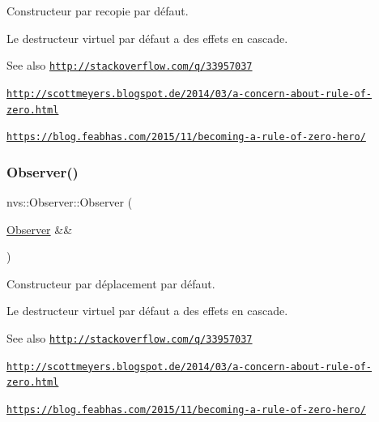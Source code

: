 Constructeur par recopie par défaut. 

Le destructeur virtuel par défaut a des effets en cascade.

\begin{DoxySeeAlso}{See also}
\href{http://stackoverflow.com/q/33957037}{\tt http\+://stackoverflow.\+com/q/33957037} 

\href{http://scottmeyers.blogspot.de/2014/03/a-concern-about-rule-of-zero.html}{\tt http\+://scottmeyers.\+blogspot.\+de/2014/03/a-\/concern-\/about-\/rule-\/of-\/zero.\+html} 

\href{https://blog.feabhas.com/2015/11/becoming-a-rule-of-zero-hero/}{\tt https\+://blog.\+feabhas.\+com/2015/11/becoming-\/a-\/rule-\/of-\/zero-\/hero/} 
\end{DoxySeeAlso}
\mbox{\label{classnvs_1_1_observer_a3058c1a0d319e92a563a6ed09354e8f6}} 
\subsubsection{\texorpdfstring{Observer()}{Observer()}\hspace{0.1cm}{\footnotesize\ttfamily [2/3]}}
{\footnotesize\ttfamily nvs\+::\+Observer\+::\+Observer (\begin{DoxyParamCaption}\item[{\mbox{\hyperlink{classnvs_1_1_observer}{Observer}} \&\&}]{ }\end{DoxyParamCaption})\hspace{0.3cm}{\ttfamily [default]}}



Constructeur par déplacement par défaut. 

Le destructeur virtuel par défaut a des effets en cascade.

\begin{DoxySeeAlso}{See also}
\href{http://stackoverflow.com/q/33957037}{\tt http\+://stackoverflow.\+com/q/33957037} 

\href{http://scottmeyers.blogspot.de/2014/03/a-concern-about-rule-of-zero.html}{\tt http\+://scottmeyers.\+blogspot.\+de/2014/03/a-\/concern-\/about-\/rule-\/of-\/zero.\+html} 

\href{https://blog.feabhas.com/2015/11/becoming-a-rule-of-zero-hero/}{\tt https\+://blog.\+feabhas.\+com/2015/11/becoming-\/a-\/rule-\/of-\/zero-\/hero/} 
\end{DoxySeeAlso}
\mbox{\label{classnvs_1_1_observer_a755ac6084a75b80cf8b7a7cf6fd4e8dd}} 
